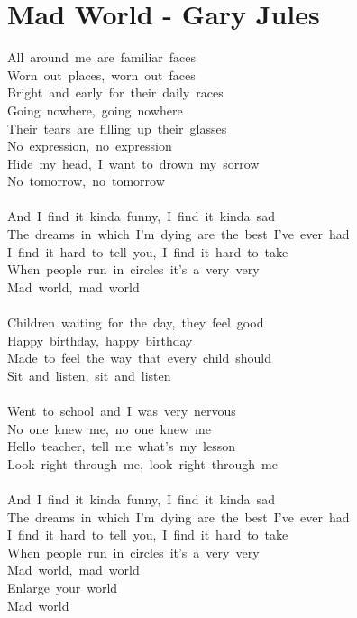 \documentclass[]{book}
\let\stdsection\section
\renewcommand\section{\clearpage\stdsection}
\begin{document}
\hypertarget{mad-world---gary-jules}{%
\section{Mad World - Gary Jules}\label{mad-world---gary-jules}}

All~around~me~are~familiar~faces\\
Worn~out~places,~worn~out~faces\\
Bright~and~early~for~their~daily~races\\
Going~nowhere,~going~nowhere\\
Their~tears~are~filling~up~their~glasses\\
No~expression,~no~expression\\
Hide~my~head,~I~want~to~drown~my~sorrow\\
No~tomorrow,~no~tomorrow\\
~\\
And~I~find~it~kinda~funny,~I~find~it~kinda~sad\\
The~dreams~in~which~I'm~dying~are~the~best~I've~ever~had\\
I~find~it~hard~to~tell~you,~I~find~it~hard~to~take\\
When~people~run~in~circles~it's~a~very~very\\
Mad~world,~mad~world\\
~\\
Children~waiting~for~the~day,~they~feel~good\\
Happy~birthday,~happy~birthday\\
Made~to~feel~the~way~that~every~child~should\\
Sit~and~listen,~sit~and~listen\\
~\\
Went~to~school~and~I~was~very~nervous\\
No~one~knew~me,~no~one~knew~me\\
Hello~teacher,~tell~me~what's~my~lesson\\
Look~right~through~me,~look~right~through~me\\
~\\
And~I~find~it~kinda~funny,~I~find~it~kinda~sad\\
The~dreams~in~which~I'm~dying~are~the~best~I've~ever~had\\
I~find~it~hard~to~tell~you,~I~find~it~hard~to~take\\
When~people~run~in~circles~it's~a~very~very\\
Mad~world,~mad~world\\
Enlarge~your~world\\
Mad~world\\
\end{document}
